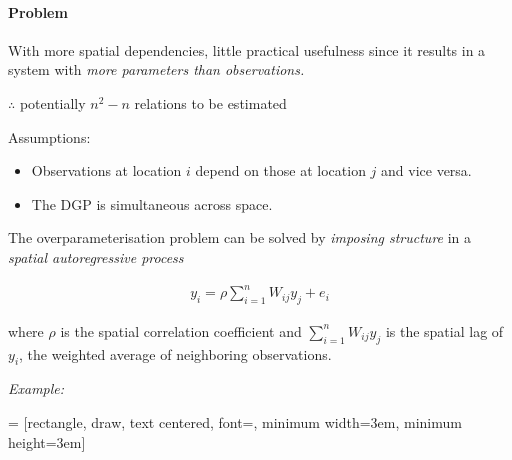 \paragraph{Problem} 
With more spatial dependencies, little practical usefulness since it results in a system with \emph{more parameters than observations.}

$\therefore$ potentially $n^2 - n$ relations to be estimated

Assumptions:

\begin{itemize}
\item Observations at location $i$ depend on those at location $j$ and vice versa.
\item The DGP is simultaneous across space.
\end{itemize}

The overparameterisation problem can be solved by \emph{imposing structure} in a \emph{spatial autoregressive process}

\begin{eqnarray}\label{eqn_spatialDGP}
y_{i} = \rho \sum_{i=1}^{n} W_{ij} y_{j} + e_{i}
\end{eqnarray}

\noindent where $\rho$ is the spatial correlation coefficient and $\sum_{i=1}^{n} W_{ij} y_{j}$ is the spatial lag of $y_i$, the weighted average of neighboring observations.

\emph{Example:}

 = [rectangle, draw, text centered, font=\large,
    minimum width=3em, minimum height=3em]



